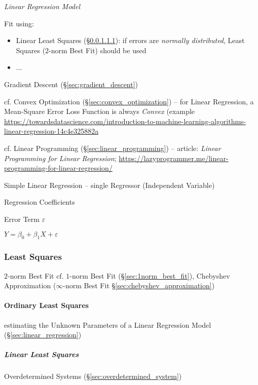\emph{Linear Regression Model}

Fit using:
\begin{itemize}
  \item Linear Least Squares (\S\ref{sec:linear_least_squares}): if errors are
    \emph{normally distributed}, Least Squares ($2$-norm Best Fit) should be
    used
  \item ...
\end{itemize}

Gradient Descent (\S\ref{sec:gradient_descent})

cf. Convex Optimization (\S\ref{sec:convex_optimization}) -- for Linear
Regression, a Mean-Square Error Loss Function is always \emph{Convex} (example
\url{https://towardsdatascience.com/introduction-to-machine-learning-algorithms-linear-regression-14c4e325882a}

cf. Linear Programming (\S\ref{sec:linear_programming})
-- article: \emph{Linear Programming for Linear Regression};
\url{https://lazyprogrammer.me/linear-programming-for-linear-regression/}

Simple Linear Regression -- single Regressor (Independent Variable)

Regression Coefficients

Error Term $\varepsilon$

$Y = \beta_0 + \beta_1 X + \varepsilon$



\subsubsection{Least Squares}\label{sec:least_squares}

$2$-norm Best Fit \fist cf. $1$-norm Best Fit (\S\ref{sec:1norm_best_fit}),
Chebyshev Approximation ($\infty$-norm Best Fit
\S\ref{sec:chebyshev_approximation})



\paragraph{Ordinary Least Squares}\label{sec:ordinary_least_squares}\hfill

estimating the Unknown Parameters of a Linear Regression Model
(\S\ref{sec:linear_regression})



\subparagraph{Linear Least Squares}\label{sec:linear_least_squares}\hfill

Overdetermined Systems (\S\ref{sec:overdetermined_system})

